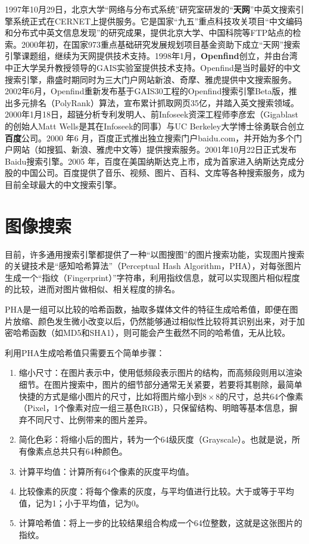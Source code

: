 1997年10月29日，北京大学“网络与分布式系统”研究室研发的“\textbf{天网}”中英文搜索引擎系统正式在CERNET上提供服务。它是国家“九五”重点科技攻关项目“中文编码和分布式中英文信息发现”的研究成果，提供北京大学、中国科院等FTP站点的检索。2000年初，在国家973重点基础研究发展规划项目基金资助下成立“天网”搜索引擎课题组，继续为天网提供技术支持。1998年1月，\textbf{Openfind}创立，并由台湾中正大学吴升教授领导的GAIS实验室提供技术支持。Openfind是当时最好的中文搜索引擎，鼎盛时期同时为三大门户网站新浪、奇摩、雅虎提供中文搜索服务。2002年6月，Openfind重新发布基于GAIS30工程的Openfind搜索引擎Beta版，推出多元排名（PolyRank）算法，宣布累计抓取网页35亿，并踏入英文搜索领域。2000年1月18日，超链分析专利发明人、前Infoseek资深工程师李彦宏（Gigablast的创始人Matt Wells是其在Infoseek的同事）与UC Berkeley大学博士徐勇联合创立\textbf{百度}公司。2000 年6 月，百度正式推出独立搜索门户baidu.com，并开始为多个门户网站（如搜狐、新浪、雅虎中文等）提供搜索服务。2001年10月22日正式发布Baidu搜索引擎。2005 年，百度在美国纳斯达克上市，成为首家进入纳斯达克成分股的中国公司。百度提供了音乐、视频、图片、百科、文库等各种搜索服务，成为目前全球最大的中文搜索引擎。

\section{图像搜索}
目前，许多通用搜索引擎都提供了一种“以图搜图”的图片搜索功能，实现图片搜索的关键技术是“感知哈希算法”（Perceptual Hash Algorithm，PHA），对每张图片生成一个“指纹（Fingerprint）”字符串，利用指纹信息，就可以实现图片相似程度的比较，进而对图片做相似、相关程度的排名。

PHA是一组可以比较的哈希函数，抽取多媒体文件的特征生成哈希值，即便在图片放缩、颜色发生微小改变以后，仍然能够通过相似性比较将其识别出来，对于加密哈希函数（如MD5和SHA1），则可能会产生截然不同的哈希值，无从比较。

利用PHA生成哈希值只需要五个简单步骤：
\begin{enumerate}[（1）]
  \item 缩小尺寸：在图片表示中，使用低频段表示图片的结构，而高频段则用以渲染细节。在图片搜索中，图片的细节部分通常无关紧要，若要将其剔除，最简单快捷的方式是缩小图片的尺寸，比如将图片缩小到$8\times 8$的尺寸，总共64个像素（Pixel，1个像素对应一组三基色RGB），只保留结构、明暗等基本信息，摒弃不同尺寸、比例带来的图片差异。
  \item 简化色彩：将缩小后的图片，转为一个64级灰度（Grayscale）。也就是说，所有像素点总共只有64种颜色。
  \item 计算平均值：计算所有64个像素的灰度平均值。
  \item 比较像素的灰度：将每个像素的灰度，与平均值进行比较。大于或等于平均值，记为1；小于平均值，记为0。
  \item 计算哈希值：将上一步的比较结果组合构成一个64位整数，这就是这张图片的指纹。
\end{enumerate}

